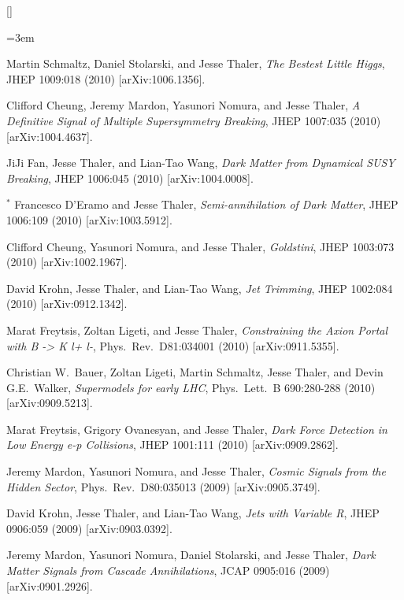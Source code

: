 \begin{list}{[]\addtocounter{jessecount}{-1}}{\leftmargin=3em \itemsep=4pt}
\item
 Martin Schmaltz, Daniel Stolarski, and Jesse Thaler,
\emph{The Bestest Little Higgs},
JHEP 1009:018 (2010)
[arXiv:1006.1356].

\item
 Clifford Cheung, Jeremy Mardon, Yasunori Nomura, and Jesse Thaler,
\emph{A Definitive Signal of Multiple Supersymmetry Breaking},
JHEP 1007:035 (2010)
[arXiv:1004.4637].

\item
 JiJi Fan, Jesse Thaler, and Lian-Tao Wang,
\emph{Dark Matter from Dynamical SUSY Breaking},
JHEP 1006:045 (2010)
[arXiv:1004.0008].

\item
${}^\ast$ Francesco D'Eramo and Jesse Thaler,
\emph{Semi-annihilation of Dark Matter},
JHEP 1006:109 (2010)
[arXiv:1003.5912].

\item
 Clifford Cheung, Yasunori Nomura, and Jesse Thaler,
\emph{Goldstini},
JHEP 1003:073 (2010)
[arXiv:1002.1967].

\item
 David Krohn, Jesse Thaler, and Lian-Tao Wang,
\emph{Jet Trimming},
JHEP 1002:084 (2010)
[arXiv:0912.1342].

\item
 Marat Freytsis, Zoltan Ligeti, and Jesse Thaler,
\emph{Constraining the Axion Portal with B -> K l+ l-},
Phys.\ Rev.\ D81:034001 (2010)
[arXiv:0911.5355].

\item
 Christian W.\ Bauer, Zoltan Ligeti, Martin Schmaltz, Jesse Thaler, and Devin G.E.\ Walker,
\emph{Supermodels for early LHC},
Phys.\ Lett.\ B 690:280-288 (2010)
[arXiv:0909.5213].

\item
 Marat Freytsis, Grigory Ovanesyan, and Jesse Thaler,
\emph{Dark Force Detection in Low Energy e-p Collisions},
JHEP 1001:111 (2010)
[arXiv:0909.2862].

\item
 Jeremy Mardon, Yasunori Nomura, and Jesse Thaler,
\emph{Cosmic Signals from the Hidden Sector},
Phys.\ Rev.\ D80:035013 (2009)
[arXiv:0905.3749].

\item
 David Krohn, Jesse Thaler, and Lian-Tao Wang,
\emph{Jets with Variable R},
JHEP 0906:059 (2009)
[arXiv:0903.0392].

\item
 Jeremy Mardon, Yasunori Nomura, Daniel Stolarski, and Jesse Thaler,
\emph{Dark Matter Signals from Cascade Annihilations},
JCAP 0905:016 (2009)
[arXiv:0901.2926].


\end{list}
